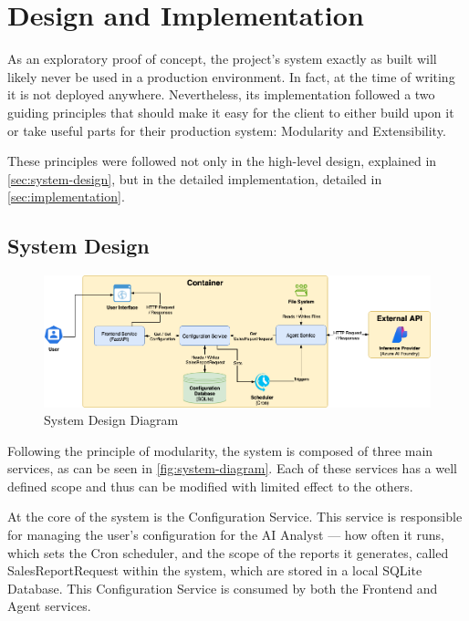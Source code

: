 \documentclass[a4paper]{report}
\begin{document}
\chapter{Design and Implementation}
\label{chapter:design-implementation}

As an exploratory proof of concept, the project's system exactly as built will likely never be used in a production environment. In fact, at the time of writing it is not deployed anywhere. Nevertheless, its implementation followed a two guiding principles that should make it easy for the client to either build upon it or take useful parts for their production system: Modularity and Extensibility.

These principles were followed not only in the high-level design, explained in \autoref{sec:system-design}, but in the detailed implementation, detailed in \autoref{sec:implementation}.

\section{System Design}
\label{sec:system-design}

\begin{figure}[h]
\centering
\includegraphics[width=1\textwidth]{images/system-diagram.png}
\caption{System Design Diagram}
\label{fig:system-diagram}
\end{figure}

Following the principle of modularity, the system is composed of three main services, as can be seen in \autoref{fig:system-diagram}. Each of these services has a well defined scope and thus can be modified with limited effect to the others.

At the core of the system is the Configuration Service. This service is responsible for managing the user's configuration for the AI Analyst --- how often it runs, which sets the Cron scheduler, and the scope of the reports it generates, called SalesReportRequest within the system, which are stored in a local SQLite Database. This Configuration Service is consumed by both the Frontend and Agent services.
\end{document}
